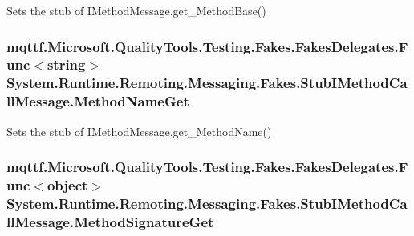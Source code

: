 Sets the stub of I\-Method\-Message.\-get\-\_\-\-Method\-Base()

\hypertarget{class_system_1_1_runtime_1_1_remoting_1_1_messaging_1_1_fakes_1_1_stub_i_method_call_message_a7f097a0317b63add9da0fbb222cde617}{
\subsubsection[{Method\-Name\-Get}]{\setlength{\rightskip}{0pt plus 5cm}mqttf.\-Microsoft.\-Quality\-Tools.\-Testing.\-Fakes.\-Fakes\-Delegates.\-Func$<$string$>$ System.\-Runtime.\-Remoting.\-Messaging.\-Fakes.\-Stub\-I\-Method\-Call\-Message.\-Method\-Name\-Get}}\label{class_system_1_1_runtime_1_1_remoting_1_1_messaging_1_1_fakes_1_1_stub_i_method_call_message_a7f097a0317b63add9da0fbb222cde617}


Sets the stub of I\-Method\-Message.\-get\-\_\-\-Method\-Name()

\hypertarget{class_system_1_1_runtime_1_1_remoting_1_1_messaging_1_1_fakes_1_1_stub_i_method_call_message_a5339de07f0869b374982598530319ac4}{
\subsubsection[{Method\-Signature\-Get}]{\setlength{\rightskip}{0pt plus 5cm}mqttf.\-Microsoft.\-Quality\-Tools.\-Testing.\-Fakes.\-Fakes\-Delegates.\-Func$<$object$>$ System.\-Runtime.\-Remoting.\-Messaging.\-Fakes.\-Stub\-I\-Method\-Call\-Message.\-Method\-Signature\-Get}}\label{class_system_1_1_runtime_1_1_remoting_1_1_messaging_1_1_fakes_1_1_stub_i_method_call_message_a5339de07f0869b374982598530319ac4}


